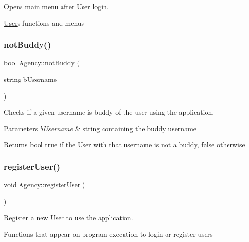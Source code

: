 Opens main menu after \hyperlink{class_user}{User} login. 

\hyperlink{class_user}{User}\textquotesingle{}s functions and menus \mbox{\label{group___agency_ga9cbd4d4f5f20f6ec9e3d3088cf61f96a}} 
\subsubsection{\texorpdfstring{not\+Buddy()}{notBuddy()}}
{\footnotesize\ttfamily bool Agency\+::not\+Buddy (\begin{DoxyParamCaption}\item[{string}]{b\+Username }\end{DoxyParamCaption})}



Checks if a given username is buddy of the user using the application. 


\begin{DoxyParams}{Parameters}
{\em b\+Username} & string containing the buddy username\\
\hline
\end{DoxyParams}
\begin{DoxyReturn}{Returns}
bool true if the \hyperlink{class_user}{User} with that username is not a buddy, false otherwise 
\end{DoxyReturn}
\mbox{\label{group___agency_ga75a16a58bcbc705df50e89531f513c49}} 
\subsubsection{\texorpdfstring{register\+User()}{registerUser()}}
{\footnotesize\ttfamily void Agency\+::register\+User (\begin{DoxyParamCaption}{ }\end{DoxyParamCaption})}



Register a new \hyperlink{class_user}{User} to use the application. 

Functions that appear on program execution to login or register users \mbox{\label{group___agency_ga76d5990291e33a194a46c390986a668b}} 
